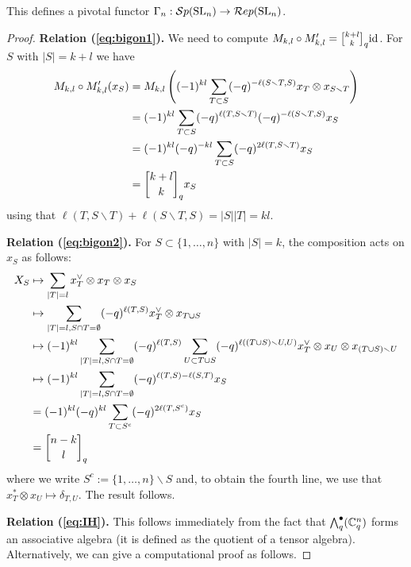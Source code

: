 \documentclass[11pt]{amsart}
\begin{document}
\begin{thm}\label{thm:gamma}
This defines a pivotal functor $\Gamma_n: {\mathcal{S}p}({\rm{SL}}_n) \rightarrow \mathcal{R}ep({\rm{SL}}_n)$.
\end{thm}
\begin{proof}
{\bf Relation (\ref{eq:bigon1}).} We need to compute $M_{k,l} \circ M'_{k,l} = \qBinomial{k+l}{k} {\rm{id}}$. For $S $ with $|S|=k+l$ we have 
\begin{align*}
M_{k,l} \circ M'_{k,l}(x_S) 
&= M_{k,l} \left( (-1)^{kl} \sum_{T \subset S} (-q)^{- \ell( S \smallsetminus T, S)} x_T \otimes x_{S \smallsetminus T} \right) \\
&= (-1)^{kl}\sum_{T \subset S} (-q)^{\ell(T, S \smallsetminus T)} (-q)^{- \ell( S \smallsetminus T, S)} x_S \\
&= (-1)^{kl} (-q)^{-kl} \sum_{T \subset S} (-q)^{2\ell(T, S \smallsetminus T)} x_S \\
&= \qBinomial{k+l}{k} x_S
\end{align*}
using that $ \ell(T, S \smallsetminus T) + \ell( S \smallsetminus T, S) = |S||T| =kl$.


{\bf Relation (\ref{eq:bigon2}).} For $S \subset \{1,\dots,n\}$ with $|S|=k$, the composition acts on $x_S$ as follows:
\begin{align*}
X_S 
&\mapsto \sum_{|T|=l} x_T^\vee \otimes x_T \otimes x_S \\
&\mapsto \sum_{|T|=l, S \cap T = \emptyset} (-q)^{\ell(T,S)} x_T^\vee \otimes x_{T \cup S} \\
&\mapsto (-1)^{kl} \sum_{|T|=l, S \cap T = \emptyset} (-q)^{\ell(T,S)} \sum_{U \subset T \cup S} (-q)^{\ell((T \cup S) \smallsetminus U,U)} x_T^\vee \otimes x_U \otimes x_{(T \cup S) \smallsetminus U} \\
&\mapsto (-1)^{kl} \sum_{|T|=l, S \cap T = \emptyset} (-q)^{\ell(T,S) - \ell(S,T)} x_S \\
&= (-1)^{kl} (-q)^{kl} \sum_{T \subset S^c} (-q)^{2\ell(T, S^c)} x_S \\
&= \qBinomial{n-k}{l}
\end{align*}
where we write $S^c := \{1, \dots, n\} \smallsetminus S$ and, to obtain the fourth line, we use that $x_T^* \otimes x_U \mapsto \delta_{T,U}$. The result follows.

{\bf Relation (\ref{eq:IH}).}  This follows immediately from the fact that $ {\textstyle\bigwedge^{\bullet}_{q}}({\mathbb{C}}^n_q) $ forms an associative algebra (it is defined as the quotient of a tensor algebra).  Alternatively, we can give a computational proof as follows.


\end{proof}
\end{document}
